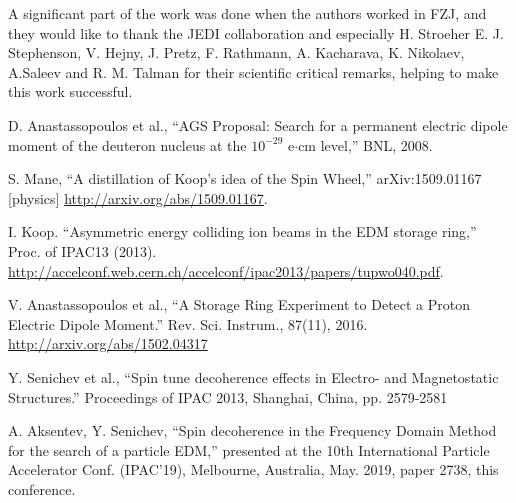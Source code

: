 \documentclass[a4paper]{jacow}
\begin{document}
A significant part of the work was done when the authors worked in FZJ, and they would like to thank the JEDI collaboration and especially H. Stroeher E. J. Stephenson, V. Hejny, J. Pretz, F. Rathmann, A. Kacharava, K. Nikolaev,  A.Saleev and R. M. Talman for their scientific critical remarks, helping to make this work successful.

\begin{thebibliography}{9}
  
  D. Anastassopoulos et al., ``AGS Proposal: Search for a permanent electric dipole moment of
  the deuteron nucleus at the $10^{-29}$ e$\cdot$cm level,'' BNL, 2008.

  S. Mane, ``A distillation of Koop's idea of the Spin Wheel,'' arXiv:1509.01167 [physics]
  \url{http://arxiv.org/abs/1509.01167}.

  I. Koop. ``Asymmetric energy colliding ion beams in the EDM storage ring,'' Proc. of IPAC13 (2013).
  \url{http://accelconf.web.cern.ch/accelconf/ipac2013/papers/tupwo040.pdf}.

  V. Anastassopoulos et al., ``A Storage Ring Experiment to Detect a Proton Electric Dipole Moment.''
  Rev. Sci. Instrum., 87(11), 2016.
  \url{http://arxiv.org/abs/1502.04317}

  Y. Senichev et al., ``Spin tune decoherence effects in Electro- and Magnetostatic Structures.''
  Proceedings of IPAC 2013, Shanghai, China, pp. 2579-2581

  A. Aksentev, Y. Senichev, ``Spin decoherence in the Frequency Domain Method for the search of a particle EDM,''
  presented at the 10th International Particle Accelerator Conf. (IPAC’19), Melbourne, Australia,
  May. 2019, paper 2738, this conference.
  

\end{thebibliography}
\end{document}
